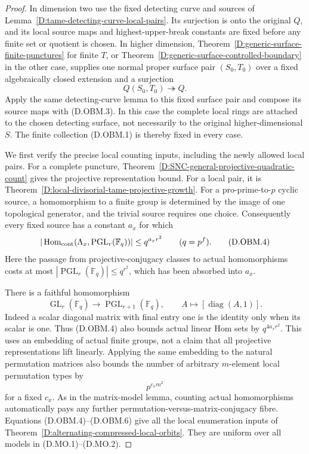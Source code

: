 \begin{proof}
In dimension two use the fixed detecting curve and sources
of Lemma~\ref{D:tame-detecting-curve-local-pairs}. Its
surjection is onto the original $Q$, and its local source
maps and highest-upper-break constants are fixed before
any finite set or quotient is chosen. In higher dimension,
Theorem~\ref{D:generic-surface-finite-punctures} for finite
$T$, or Theorem~\ref{D:generic-surface-controlled-boundary}
in the other case, supplies one normal proper surface
pair $(S_0,T_0)$ over a fixed algebraically closed extension
and a surjection
\[
                         Q(S_0,T_0)\twoheadrightarrow Q.
                                                        \tag{D.OBM.3}
\]
Apply the same detecting-curve lemma to this fixed surface
pair and compose its source maps with (D.OBM.3). In this
case the complete local rings are attached to the chosen
detecting surface, not necessarily to the original
higher-dimensional $S$. The finite collection (D.OBM.1)
is thereby fixed in every case.

We first verify the precise local counting inputs, including
the newly allowed local pairs. For a complete puncture,
Theorem~\ref{D:SNC-general-projective-quadratic-count}
gives the projective representation bound. For a local
pair, it is
Theorem~\ref{D:local-divisorial-tame-projective-growth}.
For a pro-prime-to-$p$ cyclic source, a homomorphism to
a finite group is determined by the image of one
topological generator, and the trivial source requires
one choice. Consequently every fixed source has a
constant $a_x$ for which
\[
 |\operatorname{Hom}_{\rm cont}
       (\Lambda_x,\operatorname{PGL}_r(\mathbb F_q))|
                          \le q^{a_x r^2}
                    \qquad(q=p^f).                     \tag{D.OBM.4}
\]
Here the passage from projective-conjugacy classes to
actual homomorphisms costs at most
$|\operatorname{PGL}_r(\mathbb F_q)|\le q^{r^2}$,
which has been absorbed into $a_x$.

There is a faithful homomorphism
\[
 \operatorname{GL}_r(\mathbb F_q)\longrightarrow
 \operatorname{PGL}_{r+1}(\mathbb F_q),\qquad
                 A\longmapsto[\operatorname{diag}(A,1)].
                                                        \tag{D.OBM.5}
\]
Indeed a scalar diagonal matrix with final entry one is
the identity only when its scalar is one. Thus (D.OBM.4)
also bounds actual linear Hom sets by $q^{4a_xr^2}$.
This uses an embedding of actual finite groups, not a
claim that all projective representations lift linearly.
Applying the same embedding to the natural permutation
matrices also bounds the number of arbitrary
$m$-element local permutation types by
\[
                              p^{c_xm^2}                \tag{D.OBM.6}
\]
for a fixed $c_x$. As in the matrix-model lemma, counting
actual homomorphisms automatically pays any further
permutation-versus-matrix-conjugacy fibre.
Equations (D.OBM.4)--(D.OBM.6) give all the local
enumeration inputs of
Theorem~\ref{D:alternating-compressed-local-orbits}.
They are uniform over all models in (D.MO.1)--(D.MO.2).


\end{proof}
